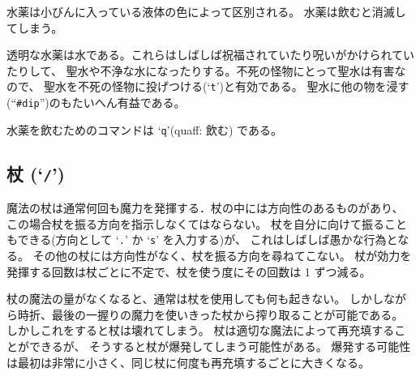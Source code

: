 水薬は小びんに入っている液体の色によって区別される。
水薬は飲むと消滅してしまう。

透明な水薬は水である。これらはしばしば祝福されていたり呪いがかけられていたりして、
聖水や不浄な水になったりする。不死の怪物にとって聖水は有害なので、
聖水を不死の怪物に投げつける(`{\tt t}')と有効である。
聖水に他の物を浸す(``{\tt \#dip}'')のもたいへん有益である。

水薬を飲むためのコマンドは `{\tt q}'(quaff: 飲む) である。

\subsection*{杖 (`{\tt /}')}

魔法の杖は通常何回も魔力を発揮する．杖の中には方向性のあるものがあり、
この場合杖を振る方向を指示しなくてはならない。
杖を自分に向けて振ることもできる(方向として `{\tt .}' か `{\tt s}' を入力する)が、
これはしばしば愚かな行為となる。
その他の杖には方向性がなく、杖を振る方向を尋ねてこない。
杖が効力を発揮する回数は杖ごとに不定で、杖を使う度にその回数は 1 ずつ減る。

杖の魔法の量がなくなると、通常は杖を使用しても何も起きない。
しかしながら時折、最後の一握りの魔力を使いきった杖から搾り取ることが可能である。
しかしこれをすると杖は壊れてしまう。
杖は適切な魔法によって再充填することができるが、
そうすると杖が爆発してしまう可能性がある。
爆発する可能性は最初は非常に小さく、同じ杖に何度も再充填するごとに大きくなる。

